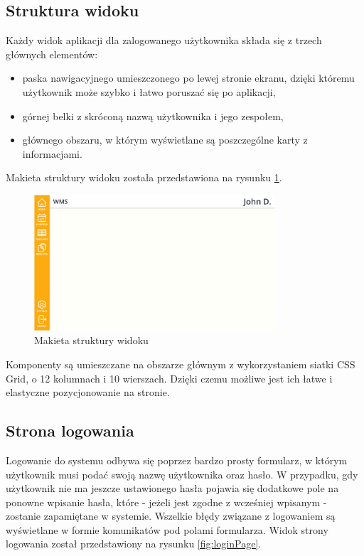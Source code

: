 \subsection{Struktura widoku}

Każdy widok aplikacji dla zalogowanego użytkownika składa się z trzech głównych elementów:
\begin{itemize}
    \item paska nawigacyjnego umieszczonego po lewej stronie ekranu, dzięki któremu użytkownik może szybko i łatwo poruszać się po aplikacji,
    \item górnej belki z skróconą nazwą użytkownika i jego zespołem,
    \item głównego obszaru, w którym wyświetlane są poszczególne karty z informacjami.
\end{itemize}

Makieta struktury widoku została przedstawiona na rysunku \ref{fig:layout}.

\begin{figure}[H]
    \centering
    \includegraphics[width=0.8\textwidth, frame]{graf/front/layoutMockup.png}
    \caption{Makieta struktury widoku}
    \label{fig:layout}
\end{figure}

Komponenty są umieszczane na obszarze głównym z wykorzystaniem siatki CSS Grid, o 12 kolumnach i 10 wierszach. Dzięki czemu możliwe jest ich łatwe i elastyczne pozycjonowanie na stronie.

\subsection{Strona logowania}

Logowanie do systemu odbywa się poprzez bardzo prosty formularz, w którym użytkownik musi podać swoją nazwę użytkownika oraz hasło. W przypadku, gdy użytkownik nie ma jeszcze ustawionego hasła pojawia się dodatkowe pole na ponowne wpisanie hasła, które - jeżeli jest zgodne z wcześniej wpisanym - zostanie zapamiętane w systemie. Wszelkie błędy związane z logowaniem są wyświetlane w formie komunikatów pod polami formularza.
Widok strony logowania został przedstawiony na rysunku \ref{fig:loginPage}.

